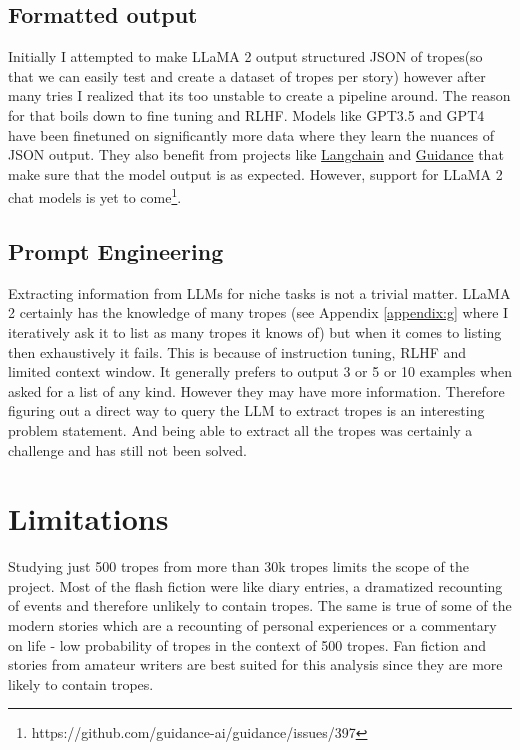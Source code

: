 \documentclass[11pt]{article}
\begin{document}
\subsection{Formatted output} \label{formattedoutput}
Initially I attempted to make LLaMA 2 output structured JSON of tropes(so that we can easily test and create a dataset of tropes per story) however after many tries I realized that its too unstable to create a pipeline around. The reason for that boils down to fine tuning and RLHF. Models like GPT3.5 and GPT4 have been finetuned on significantly more data where they learn the nuances of JSON output. They also benefit from projects like \href{https://github.com/langchain-ai/langchain}{Langchain} and \href{https://github.com/guidance-ai/guidance}{Guidance} that make sure that the model output is as expected. However, support for LLaMA 2 chat models is yet to come\footnote[1]{https://github.com/guidance-ai/guidance/issues/397\label{issue}}.

\subsection{Prompt Engineering}
Extracting information from LLMs for niche tasks is not a trivial matter. LLaMA 2 certainly has the knowledge of many tropes (see Appendix \ref{appendix:g} where I iteratively ask it to list as many tropes it knows of) but when it comes to listing then exhaustively it fails. This is because of instruction tuning, RLHF and limited context window. It generally prefers to output 3 or 5 or 10 examples when asked for a list of any kind. However they may have more information. Therefore figuring out a direct way to query the LLM to extract tropes is an interesting problem statement. And being able to extract all the tropes was certainly a challenge and has still not been solved. 

\section{Limitations} \label{discussion}
Studying just 500 tropes from more than 30k tropes limits the scope of the project. Most of the flash fiction were like diary entries, a dramatized recounting of events and therefore unlikely to contain tropes.
The same is true of some of the modern stories which are a recounting of personal experiences or a commentary on life - low probability of tropes in the context of 500 tropes. Fan fiction and stories from amateur writers are best suited for this analysis since they are more likely to contain tropes.
\printbibliography
\clearpage
\appendix
\end{document}
